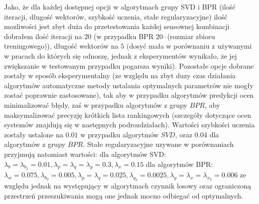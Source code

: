 \documentclass{pracamgr}
\begin{document}
   Jako, że dla każdej dostępnej opcji w algorytmach grupy SVD i BPR (ilość iteracji, długość wektorów, szybkość uczenia, stałe regularyzacyjne)
   ilość mozliwości jest zbyt duża do przetestowania każdej sensownej kombinacji dobrałem ilość iteracji na $20$
   (w przypadku BPR $20\cdot$(rozmiar zbioru treningowego)), długość wektorów na $5$
   (dosyć mała w porównaniu z używanymi w pracach do których się odnoszę, jednak z eksperymentów wynikało, że jej zwiększanie w testowanym przypadku
   pogarsza wyniki). Pozostałe opcje dobrane zostały w sposób eksperymentalny
   (ze względu na zbyt duzy czas działania algorytmów automatyczne metody ustalania optymalnych parametrów nie mogły zostać poprawnie zastosowane),
   tak aby w przypadku algorytmów predykcji ocen minimalizować błędy, zaś w przypadku algorytmów z grupy $BPR$, aby maksymalizować precyzję
   krótkich lista rankingowych (szczegóły dotyczące ocen systemów znajdują się w następnych podrozdziałach).
   Wartości szybkości uczenia zostały ustalone na $0.01$ w przypadku algorytmów $SVD$, oraz $0.04$ dla algorytmów z grupy $BPR$.
   Stałe regularyzacyjne uzywane w porównaniach przyjmują natomiast wartości:\newline
   dla algorytmów SVD:\newline
   $\lambda_b=\lambda_{b_2}=0.01,\lambda_p=\lambda_q=\lambda_y=0.3,\lambda_x=0.15$\newline
   dla algorytmów BPR:\newline
   $\lambda_w=0.075,\lambda_{b_2}=0.005,\lambda_p=\lambda_q=0.025,\lambda_{q_2}=0.0025,\lambda_y=\lambda_x=\lambda_{x_2}=0.006$\newline
   ze względu jednak na występujący w algorytmach czynnik losowy oraz ograniczoną przestrzeń przeszukiwania mogą one jednak mocno odbiegać od optymalnych.\newline
   
\end{document}
